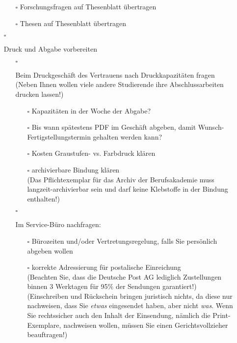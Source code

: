 \begin{itemize}
{\begin{itemize}
{\begin{itemize}
                    \item[$\square$] Forschungsfragen auf Thesenblatt übertragen
                    \item[$\square$] Thesen auf Thesenblatt übertragen
                \end{itemize}
            }
        \end{itemize}
    }
\clearpage
    \item[$\square$]{
        Druck und Abgabe vorbereiten
        \begin{itemize}
             \item[$\square$]{
                Beim Druckgeschäft des Vertrauens nach Druckkapazitäten fragen\\
                (Neben Ihnen wollen viele andere Studierende ihre Abschlussarbeiten drucken lassen!)
                \begin{itemize}
                    \item[$\square$] Kapazitäten in der Woche der Abgabe?
                    \item[$\square$] Bis wann spätestens PDF im Geschäft abgeben, damit Wunsch-Fertigstellungstermin gehalten werden kann?
                    \item[$\square$] Kosten Graustufen- vs. Farbdruck klären
                    \item[$\square$]{
                        archivierbare Bindung klären\\
                        (Das Pflichtexemplar für das Archiv der Berufsakademie muss langzeit-archivierbar sein und darf keine Klebstoffe in der Bindung enthalten!)
                    }
                \end{itemize}
            }
            \item[$\square$]{
                Im Service-Büro nachfragen:
                \begin{itemize}
                    \item[$\square$] Bürozeiten und/oder Vertretungsregelung, falls Sie persönlich abgeben wollen
                    \item[$\square$]{
                        korrekte Adressierung für postalische Einreichung\\
                        (Beachten Sie, dass die Deutsche Post AG lediglich Zustellungen binnen 3 Werktagen für 95\% der Sendungen garantiert!)\\
                        (Einschreiben und Rückschein bringen juristisch nichts, da diese nur nachweisen, dass Sie \emph{etwas} eingesendet haben, aber nicht \emph{was}. Wenn Sie rechtssicher auch den Inhalt der Einsendung, nämlich die Print-Exemplare, nachweisen wollen, müssen Sie einen Gerichtsvollzieher beauftragen!)
}
\end{itemize}}
\end{itemize}}
\end{itemize}
